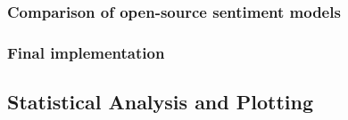\documentclass{report}
\begin{document}
\subsubsection{Comparison of open-source sentiment models}




\subsubsection{Final implementation}


\subsection{Statistical Analysis and Plotting}





\end{document}
